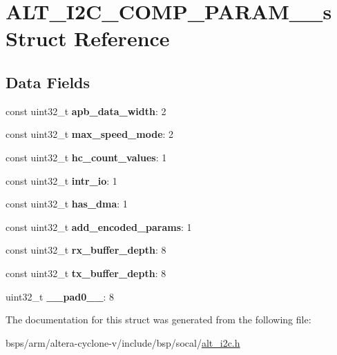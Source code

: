 \hypertarget{structALT__I2C__COMP__PARAM__1__s}{}\section{A\+L\+T\+\_\+\+I2\+C\+\_\+\+C\+O\+M\+P\+\_\+\+P\+A\+R\+A\+M\+\_\+\_\+s Struct Reference}
\label{structALT__I2C__COMP__PARAM__1__s}
\subsection*{Data Fields}
\begin{DoxyCompactItemize}
\item 
\mbox{\label{structALT__I2C__COMP__PARAM__1__s_a0ae9c68cf71b0fe2350322a7f423af5d}} 
const uint32\+\_\+t {\bfseries apb\+\_\+data\+\_\+width}\+: 2
\item 
\mbox{\label{structALT__I2C__COMP__PARAM__1__s_ac6c4e828bd1cffe16805eaaf32715a18}} 
const uint32\+\_\+t {\bfseries max\+\_\+speed\+\_\+mode}\+: 2
\item 
\mbox{\label{structALT__I2C__COMP__PARAM__1__s_a0dc696dc6d2006069ee7bcff6e42b9f4}} 
const uint32\+\_\+t {\bfseries hc\+\_\+count\+\_\+values}\+: 1
\item 
\mbox{\label{structALT__I2C__COMP__PARAM__1__s_a4cf5849623e061294869fb878152f519}} 
const uint32\+\_\+t {\bfseries intr\+\_\+io}\+: 1
\item 
\mbox{\label{structALT__I2C__COMP__PARAM__1__s_aad5329d4cbed115b937a9094e11adf3d}} 
const uint32\+\_\+t {\bfseries has\+\_\+dma}\+: 1
\item 
\mbox{\label{structALT__I2C__COMP__PARAM__1__s_a2f6a4a5277608827e97d1ce80cc6437d}} 
const uint32\+\_\+t {\bfseries add\+\_\+encoded\+\_\+params}\+: 1
\item 
\mbox{\label{structALT__I2C__COMP__PARAM__1__s_ae709eacc0460185f656a990bd457d596}} 
const uint32\+\_\+t {\bfseries rx\+\_\+buffer\+\_\+depth}\+: 8
\item 
\mbox{\label{structALT__I2C__COMP__PARAM__1__s_ab9bf94272f1698e750938a97a56c15de}} 
const uint32\+\_\+t {\bfseries tx\+\_\+buffer\+\_\+depth}\+: 8
\item 
\mbox{\label{structALT__I2C__COMP__PARAM__1__s_a5c57aa37e1891ff8a2641ac2a49ec043}} 
uint32\+\_\+t {\bfseries \+\_\+\+\_\+pad0\+\_\+\+\_\+}\+: 8
\end{DoxyCompactItemize}


The documentation for this struct was generated from the following file\+:\begin{DoxyCompactItemize}
\item 
bsps/arm/altera-\/cyclone-\/v/include/bsp/socal/\mbox{\hyperlink{socal_2alt__i2c_8h}{alt\+\_\+i2c.\+h}}\end{DoxyCompactItemize}
